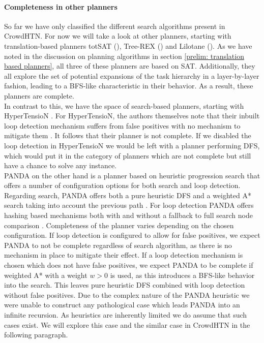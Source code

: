 \paragraph{Completeness in other planners}
So far we have only classified the different search algorithms present in CrowdHTN. For now we will take a look at other planners, starting with translation-based planners totSAT (\cite{behnke2018totsat}), Tree-REX (\cite{schreiber2019tree}) and Lilotane (\cite{schreiber2021lilotane}). As we have noted in the discussion on planning algorithms in section \ref{prelim: translation based planners}, all three of these planners are based on SAT. Additionally, they all explore the set of potential expansions of the task hierarchy in a layer-by-layer fashion, leading to a BFS-like characteristic in their behavior. As a result, these planners are complete. \\
In contrast to this, we have the space of search-based planners, starting with HyperTensioN \cite{magnaguagno2020hypertension}. For HyperTensioN, the authors themselves note that their inbuilt loop detection mechanism suffers from false positives with no mechanism to mitigate them \cite{magnaguagno2020hypertension}. It follows that their planner is not complete. If we disabled the loop detection in HyperTensioN we would be left with a planner performing DFS, which would put it in the category of planners which are not complete but still have a chance to solve any instance. \\
PANDA on the other hand is a planner based on heuristic progression search that offers a number of configuration options for both search and loop detection. Regarding search, PANDA offers both a pure heuristic DFS and a weighted A* search taking into account the previous path \cite{holler2020htn}. For loop detection PANDA offers hashing based mechanisms both with and without a fallback to full search node comparison \cite{holler2021loop}. Completeness of the planner varies depending on the chosen configuration. If loop detection is configured to allow for false positives, we expect PANDA to not be complete regardless of search algorithm, as there is no mechanism in place to mitigate their effect. If a loop detection mechanism is chosen which does not have false positives, we expect PANDA to be complete if weighted A* with a weight $w > 0$ is used, as this introduces a BFS-like behavior into the search. This leaves pure heuristic DFS combined with loop detection without false positives. Due to the complex nature of the PANDA heuristic we were unable to construct any pathological case which leads PANDA into an infinite recursion. As heuristics are inherently limited we do assume that such cases exist. We will explore this case and the similar case in CrowdHTN in the following paragraph.


